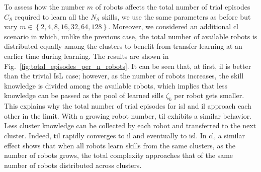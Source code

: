 \documentclass[12pt]{article}
\begin{document}
To assess how the number $m$ of robots affects the total number of trial episodes $C_\mathcal{S}$ required to learn all the $N_\mathcal{S}$ skills, we use the same parameters as before but vary $m \in \left \lbrace 2,4,8,16,32,64,128\right \rbrace$. Moreover, we considered an additional \ac{cl} scenario in which, unlike the previous case, the total number of available robots is distributed equally among the clusters to benefit from transfer learning at an earlier time during learning. The results are shown in Fig.~\ref{fig:total_episodes_per_n_robots}. It can be seen that, at first, \ac{il} is better than the trivial IsL case; however, as the number of robots increases, the skill knowledge is divided among the available robots, which implies that less knowledge can be passed as the pool of learned sills $\zeta_k$ per robot gets smaller. This explains why the total number of trial episodes for \ac{isl} and \ac{il} approach each other in the limit. With a growing robot number, \ac{til} exhibits a similar behavior. Less cluster knowledge can be collected by each robot and transferred to the next cluster. Indeed, \ac{til} rapidly converges to \ac{il} and eventually to \ac{isl}. In \ac{cl}, a similar effect shows that when all robots learn skills from the same clusters, as the number of robots grows, the total complexity approaches that of the same number of robots distributed across clusters.
\end{document}
